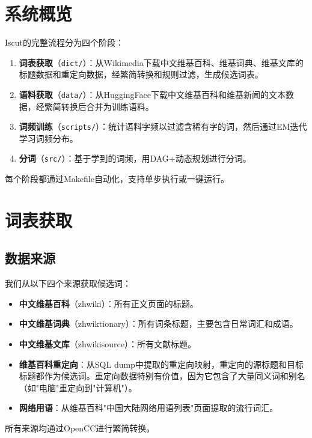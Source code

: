 \documentclass[11pt,a4paper]{article}
\begin{document}
\section{系统概览}

Iscut的完整流程分为四个阶段：

\begin{enumerate}
    \item \textbf{词表获取}（\texttt{dict/}）：从Wikimedia下载中文维基百科、维基词典、维基文库的标题数据和重定向数据，经繁简转换和规则过滤，生成候选词表。
    \item \textbf{语料获取}（\texttt{data/}）：从HuggingFace下载中文维基百科和维基新闻的文本数据，经繁简转换后合并为训练语料。
    \item \textbf{词频训练}（\texttt{scripts/}）：统计语料字频以过滤含稀有字的词，然后通过EM迭代学习词频分布。
    \item \textbf{分词}（\texttt{src/}）：基于学到的词频，用DAG+动态规划进行分词。
\end{enumerate}

每个阶段都通过Makefile自动化，支持单步执行或一键运行。

\section{词表获取}

\subsection{数据来源}

我们从以下四个来源获取候选词：

\begin{itemize}
    \item \textbf{中文维基百科}（zhwiki）：所有正文页面的标题。
    \item \textbf{中文维基词典}（zhwiktionary）：所有词条标题，主要包含日常词汇和成语。
    \item \textbf{中文维基文库}（zhwikisource）：所有文献标题。
    \item \textbf{维基百科重定向}：从SQL dump中提取的重定向映射，重定向的源标题和目标标题都作为候选词。重定向数据特别有价值，因为它包含了大量同义词和别名（如"电脑"重定向到"计算机"）。
    \item \textbf{网络用语}：从维基百科"中国大陆网络用语列表"页面提取的流行词汇。
\end{itemize}

所有来源均通过OpenCC进行繁简转换。
\end{document}
